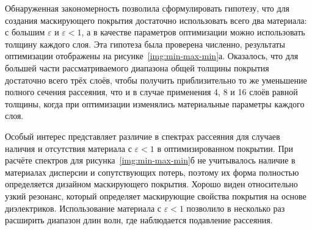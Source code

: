 Обнаруженная закономерность позволила сформулировать гипотезу,
что для создания маскирующего покрытия достаточно использовать всего
два материала: с большим $\varepsilon$ и ${\varepsilon<1}$, а в
качестве параметров оптимизации можно использовать толщину каждого
слоя. Эта гипотеза была проверена численно, результаты оптимизации
отображены на рисунке~\ref{img:min-max-min}а. Оказалось, что для
большей части рассматриваемого диапазона общей толщины покрытия 
достаточно всего трёх слоёв, чтобы получить приблизительно то же
уменьшение полного сечения рассеяния, что и в случае применения 4, 8 и
16 слоёв равной толщины, когда при оптимизации
изменялись материальные параметры каждого слоя.

Особый интерес представляет различие в спектрах рассеяния для случаев
наличия и отсутствия материала с ${\varepsilon<1}$ в оптимизированном
покрытии.  При расчёте спектров для рисунка~\ref{img:min-max-min}б не
учитывалось наличие в материалах дисперсии и сопутствующих потерь,
поэтому их форма полностью определяется дизайном маскирующего
покрытия. Хорошо виден относительно узкий резонанс, который определяет
маскирующие свойства покрытия на основе диэлектриков. Использование
материала с ${\varepsilon<1}$ позволило в несколько раз расширить
диапазон длин волн, где наблюдается подавление рассеяния. 

\clearpage
